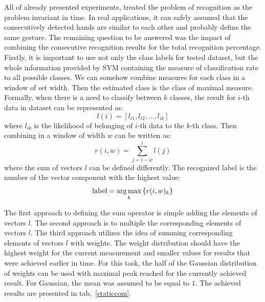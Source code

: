 All of already presented experiments, treated the problem of recognition as the problem invariant in time.
In real applications, it can safely assumed that the consecutively detected hands are similar to each other and probably define the same gesture.
The remaining question to be answered was the impact of combining the consecutive recognition results for the total recognition percentage.
Firstly, it is important to use not only the class labels for tested dataset, but the whole information provided by SVM containing the measure of classification rate to all possible classes.
We can somehow combine measures for each class in a window of set width.
Then the estimated class is the class of maximal measure.
Formally, when there is a need to classify between $k$ classes, the result for $i$-th data in dataset can be represented as:
\begin {equation}
l(i) = [l_{i1}, l_{i2}, ..., l_{ik}]
\end{equation}
where $l_{ik}$ is the likelihood of belonging of $i$-th data to the $k$-th class.
Then combining in a window of width $w$ can be written as:
\begin{equation}
r(i,w) = \sum_{j=i-w}^{i}{ l(j) }
\end{equation}
where the sum of vectors $l$ can be defined differently.
The recognized label is the number of the vector component with the highest value:
\begin{equation}
\mathrm{label} = \operatorname*{arg\,max}_{k}{\{r(i,w)_k\}}
\end{equation}

The first approach to defining the sum operator is simple adding the elements of vectors $l$.
The second approach is to multiple the corresponding elements of vectors $l$. 
The third approach utilizes the idea of summing corresponding elements of vectors $l$ with weights.
The weight distribution should have the highest weight for the current measurement and smaller values for results that were achieved earlier in time.
For this task, the half of the Gaussian distribution of weights can be used with maximal peak reached for the currently achieved result.
For Gaussian, the mean was assumed to be equal to $1$.
The achieved results are presented in tab.~\ref{staticcom}.

